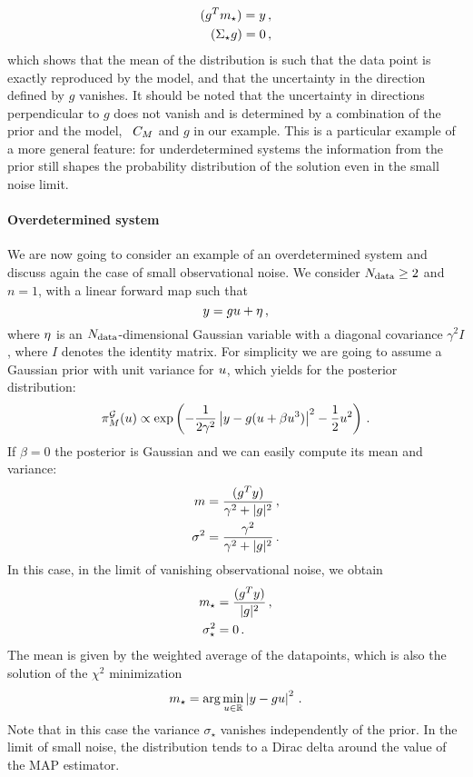 \begin{align}
  (g^T m_\star) = y \, , \\
  (\Sigma_\star g) = 0 \, ,
\end{align}
which shows that the mean of the distribution is such that the data point is
exactly reproduced by the model, and that the uncertainty in the direction
defined by $g$ vanishes. It should be noted that the uncertainty in directions
perpendicular to $g$ does not vanish and is determined by a combination of the
prior and the model, \viz\ $C_M$ and $g$ in our example. This is a
particular example of a more general feature: for underdetermined systems the
information from the prior still shapes the probability distribution of the
solution even in the small noise limit.  

\paragraph{Overdetermined system}
We are now going to consider an example of an overdetermined system and discuss
again the case of small observational noise. We consider $N_{\rm data}\geq 2$ and
$n=1$, with a linear forward map such that
\begin{equation}
 \label{eq:OverDetForwMap}
 y = g u  + \eta\, ,
\end{equation} 
where $\eta$ is an $N_{\rm data}$-dimensional Gaussian variable with a diagonal
covariance $\gamma^2 I$, where $I$ denotes the identity matrix. For simplicity
we are going to assume a Gaussian prior with unit variance for $u$, which yields
for the posterior distribution:
\begin{equation}
  \label{eq:OverDetPost}
  \pi_M^{\mathcal{G}}(u) 
    \propto 
    \exp\left(
      -\frac{1}{2\gamma^2} \left| y - g(u + \beta u^3)\right|^2
      -\frac12 u^2
    \right)\, .
\end{equation} 
If $\beta=0$ the posterior is Gaussian and we can easily compute its mean and variance: 
\begin{align}
  m &= \frac{(g^T y)}{\gamma^2 + |g|^2} \, , \\
  \sigma^2 &=
    \frac{\gamma^2}{\gamma^2 + |g|^2}\, .
\end{align}
In this case, in the limit of vanishing observational noise, we obtain
\begin{align}
  m_\star &= \frac{(g^T y)}{|g|^2} \, ,\\
  \sigma_\star^2 &= 0\, .
\end{align}
The mean is given by the weighted average of the datapoints, which is also the solution of the $\chi^2$ minimization
\begin{equation}
  m_\star = \arg\min_{u\in\mathbb{R}} \left|y - g u\right|^2\, .
\end{equation}
Note that in this case the variance $\sigma_\star$ vanishes independently of the
prior. In the limit of small noise, the distribution tends to a Dirac delta
around the value of the MAP estimator.  

